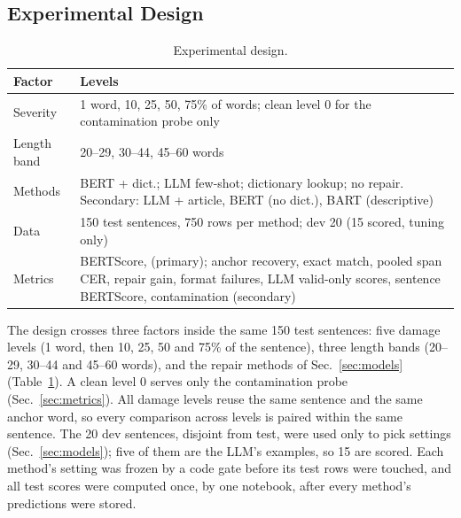 \subsection{Experimental Design}
\label{sec:design}
\begin{table}[t]
\centering
\small
\begin{tabular}{p{1.6cm}p{5.2cm}}
\toprule
Factor & Levels \\
\midrule
Severity & 1 word, 10, 25, 50, 75\% of words; clean level 0 for the contamination probe only \\
Length band & 20--29, 30--44, 45--60 words \\
Methods & BERT + dict.; LLM few-shot; dictionary lookup; no repair. Secondary: LLM + article, BERT (no dict.), BART (descriptive) \\
Data & 150 test sentences, 750 rows per method; dev 20 (15 scored, tuning only) \\
Metrics & BERTScore, \frr{} (primary); anchor recovery, exact match, pooled span CER, repair gain, format
failures, LLM valid-only scores, sentence BERTScore, contamination (secondary) \\
\bottomrule
\end{tabular}
\caption{Experimental design.}
\label{tab:design}
\end{table}
The design crosses three factors inside the same 150 test sentences: five damage levels (1 word, then 10, 25, 50
and 75\% of the sentence), three length bands (20--29, 30--44 and 45--60 words), and the repair methods of
Sec.~\ref{sec:models} (Table~\ref{tab:design}). A clean level 0 serves only the contamination probe
(Sec.~\ref{sec:metrics}). All damage levels reuse the same sentence and the same anchor word, so every comparison across levels is
paired within the same sentence. The 20 dev sentences, disjoint from test, were used only to
pick settings (Sec.~\ref{sec:models}); five of them are the LLM's examples, so 15 are scored. Each method's setting
was frozen by a code gate before its test rows were touched, and all test scores were computed once, by one
notebook, after every method's predictions were stored.


